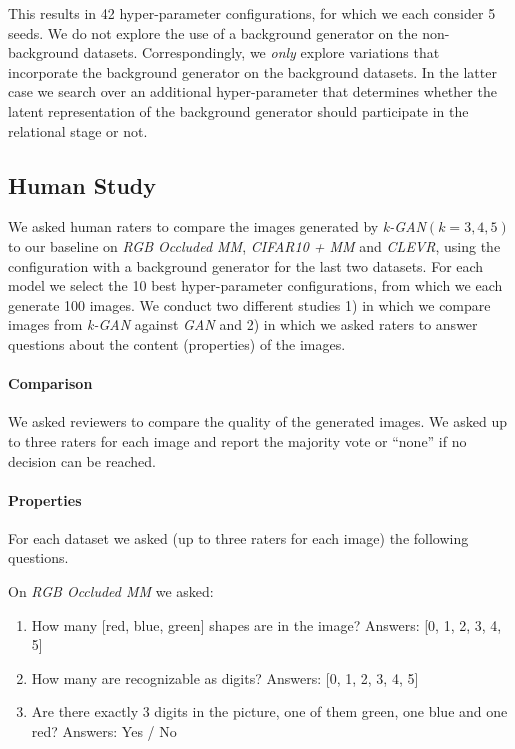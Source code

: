 \documentclass{article}
\begin{document}
This results in 42 hyper-parameter configurations, for which we each consider 5 seeds.
We do not explore the use of a background generator on the non-background datasets.
Correspondingly, we \emph{only} explore variations that incorporate the background generator on the background datasets.
In the latter case we search over an additional hyper-parameter that determines whether the latent representation of the background generator should participate in the relational stage or not.

\subsection{Human Study}

We asked human raters to compare the images generated by \emph{k-GAN}$(k=3,4,5)$ to our baseline on \emph{RGB Occluded MM}, \emph{CIFAR10 + MM} and \emph{CLEVR}, using the configuration with a background generator for the last two datasets. 
For each model we select the 10 best hyper-parameter configurations, from which we each generate 100 images.
We conduct two different studies 1) in which we compare images from \emph{k-GAN} against \emph{GAN} and 2) in which we asked raters to answer questions about the content (properties) of the images.

\paragraph{Comparison}
We asked reviewers to compare the quality of the generated images.
We asked up to three raters for each image and report the majority vote or “none” if no decision can be reached.

\paragraph{Properties}
For each dataset we asked (up to three raters for each image) the following questions.

On \emph{RGB Occluded MM} we asked:
\begin{enumerate}
\item How many [red, blue, green] shapes are in the image? Answers: [0, 1, 2, 3, 4, 5]
\item How many are recognizable as digits? Answers: [0, 1, 2, 3, 4, 5]
\item Are there exactly 3 digits in the picture, one of them green, one blue and one red? Answers: Yes / No
\end{enumerate}
\end{document}
